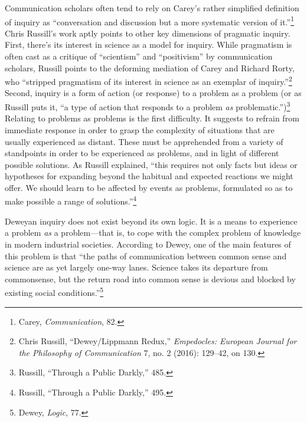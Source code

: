 \documentclass[openany,nobib]{tufte-book}
\begin{document}
Communication scholars often tend to rely on Carey's rather simplified
definition of inquiry as ``conversation and discussion but a more
systematic version of it.''\footnote{Carey, \emph{Communication}, 82.}
Chris Russill's work aptly points to other key dimensions of pragmatic
inquiry. First, there's its interest in science as a model for inquiry.
While pragmatism is often cast as a critique of ``scientism'' and
``positivism'' by communication scholars, Russill points to the
deforming mediation of Carey and Richard Rorty, who ``stripped
pragmatism of its interest in science as an exemplar of
inquiry.''\footnote{Chris Russill, ``Dewey/Lippmann Redux,''
  \emph{Empedocles: European Journal for the Philosophy of
  Communication} 7, no. 2 (2016): 129--42, on 130.} Second, inquiry is a
form of action (or response) to a problem as a problem (or as Russill
puts it, ``a type of action that responds to a problem \emph{as}
problematic.'')\footnote{Russill, ``Through a Public Darkly,'' 485.}
Relating to problems as problems is the first difficulty. It suggests to
refrain from immediate response in order to grasp the complexity of
situations that are usually experienced as distant. These must be
apprehended from a variety of standpoints in order to be experienced as
problems, and in light of different possible solutions. As Russill
explained, ``this requires not only facts but ideas or hypotheses for
expanding beyond the habitual and expected reactions we might offer. We
should learn to be affected by events as problems, formulated so as to
make possible a range of solutions.''\footnote{Russill, ``Through a
  Public Darkly,'' 495.}

Deweyan inquiry does not exist beyond its own logic. It is a means to
experience a problem \emph{as} a problem---that is, to cope with the
complex problem of knowledge in modern industrial societies. According
to Dewey, one of the main features of this problem is that ``the paths
of communication between common sense and science are as yet largely
one-way lanes. Science takes its departure from common\newpage\noindent sense, but the
return road into common sense is devious and blocked by existing social
conditions.''\footnote{Dewey, \emph{Logic}, 77.}
\end{document}
